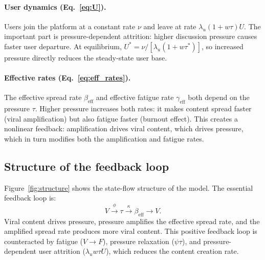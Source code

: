 \documentclass[11pt]{article}
\begin{document}
\paragraph{User dynamics (Eq.~\ref{eq:U}).} Users join the platform at a constant rate $\nu$ and leave at rate $\lambda_u(1+w\tau)U$. The important part is pressure-dependent attrition: higher discussion pressure causes faster user departure. At equilibrium, $U^* = \nu / [\lambda_u(1+w\tau^*)]$, so increased pressure directly reduces the steady-state user base.

\paragraph{Effective rates (Eq.~\ref{eq:eff_rates}).} The effective spread rate $\beta_{\mathrm{eff}}$ and effective fatigue rate $\gamma_{\mathrm{eff}}$ both depend on the pressure $\tau$. Higher pressure increases both rates: it makes content spread faster (viral amplification) but also fatigue faster (burnout effect). This creates a nonlinear feedback: amplification drives viral content, which drives pressure, which in turn modifies both the amplification and fatigue rates.

\subsection{Structure of the feedback loop}

Figure~\ref{fig:structure} shows the state-flow structure of the model. The essential feedback loop is:
\[
V \xrightarrow{\phi} \tau \xrightarrow{\kappa} \beta_{\mathrm{eff}} \xrightarrow{} V.
\]
Viral content drives pressure, pressure amplifies the effective spread rate, and the amplified spread rate produces more viral content. This positive feedback loop is counteracted by fatigue ($V \to F$), pressure relaxation ($\psi\tau$), and pressure-dependent user attrition ($\lambda_u w\tau U$), which reduces the content creation rate.
\end{document}
